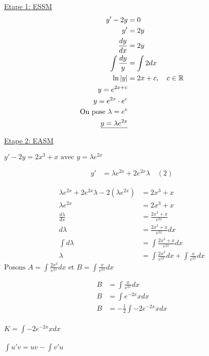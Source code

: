 \underline{Etape 1: ESSM}
\begin{align*}
	y' - 2y &= 0 \\
	y' &= 2y \\
	\frac{dy}{dx} &= 2y \\
	\int \frac{dy}{y} &= \int 2dx \\
	\ln |y| &= 2x+ c, \quad c \in \mathbb{R} \\
	y = e^{2x+c} \\
	y = e^{2x} \cdot e^c \\
	\text{On pose } \lambda = e^c \\
	\text{\underline{$y = \lambda e^{2x}$}}
\end{align*}

\underline{Etape 2: EASM} \\

$y' - 2y = 2x^3 + x \text{ avec } y = \lambda e^{2x}$

\begin{align*}
	y' &= \lambda e^{2x} + 2e^{2x}\lambda \quad (2)
\end{align*}

\begin{align*}
	\lambda e^{2x} + 2e^{2x}\lambda - 2(\lambda e^{2x}) &= 2x^3 + x \\
	\lambda e^{2x} &= 2x^3 + x \\
	\frac{d\lambda}{dx} &= \frac{2x^3 + x}{e^{2x}} \\
	d\lambda &= \frac{2x^3 + x}{e^{2x}} dx \\
	\int d\lambda &= \int \frac{2x^3 +x}{e^{2x}} dx \\
	\lambda &= \int \frac{2x^3}{e^{2x}} dx + \int \frac{x}{e^{2x}} dx
\end{align*}
$\text{Posons } A = \int \frac{2x^3}{e^{2x}} dx \text{ et } B = \int \frac{x}{e^{2x}} dx$

\begin{align*}
	B &= \int \frac{x}{e^{2x}} dx \\
	B &= \int e^{-2x} x dx \\
	B &= -\frac{1}{2}\int -2e^{-2x} x dx \\
\end{align*}

 $K = \int -2e^{-2x} x dx$ \\
 \\
$\int u'v = uv - \int v'u$ \\

